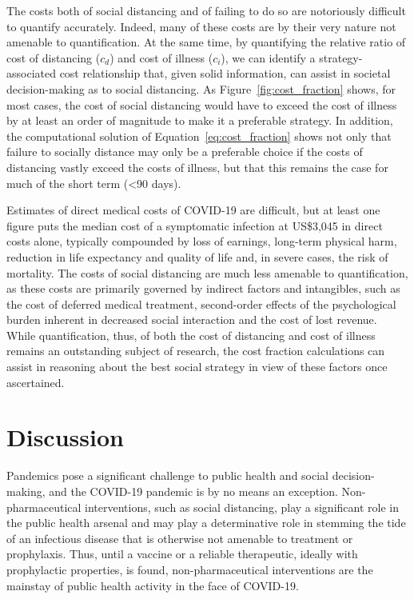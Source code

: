 \documentclass{article}
\begin{document}
The costs both of social distancing and of failing to do so are notoriously difficult to quantify accurately. Indeed, many of these costs are by their very nature not amenable to quantification. At the same time, by quantifying the relative ratio of cost of distancing ($c_d$) and cost of illness ($c_i$), we can identify a strategy-associated cost relationship that, given solid information, can assist in societal decision-making as to social distancing. As Figure~\ref{fig:cost_fraction} shows, for most cases, the cost of social distancing would have to exceed the cost of illness by at least an order of magnitude to make it a preferable strategy. In addition, the computational solution of Equation~\eqref{eq:cost_fraction} shows not only that failure to socially distance may only be a preferable choice if the costs of distancing vastly exceed the costs of illness, but that this remains the case for much of the short term (<90 days). 

Estimates of direct medical costs of COVID-19 are difficult, but at least one figure puts the median cost of a symptomatic infection at US\$3,045 in direct costs alone,\cite{bartsch2020potential} typically compounded by loss of earnings, long-term physical harm, reduction in life expectancy and quality of life and, in severe cases, the risk of mortality. The costs of social distancing are much less amenable to quantification, as these costs are primarily governed by indirect factors and intangibles, such as the cost of deferred medical treatment, second-order effects of the psychological burden inherent in decreased social interaction and the cost of lost revenue. While quantification, thus, of both the cost of distancing and cost of illness remains an outstanding subject of research, the cost fraction calculations can assist in reasoning about the best social strategy in view of these factors once ascertained.



\section{Discussion} %
\label{sec:discussion}

Pandemics pose a significant challenge to public health and social decision-making, and the COVID-19 pandemic is by no means an exception. Non-pharmaceutical interventions, such as social distancing, play a significant role in the public health arsenal and may play a determinative role in stemming the tide of an infectious disease that is otherwise not amenable to treatment or prophylaxis. Thus, until a vaccine or a reliable therapeutic, ideally with prophylactic properties, is found, non-pharmaceutical interventions are the mainstay of public health activity in the face of COVID-19.
\end{document}
